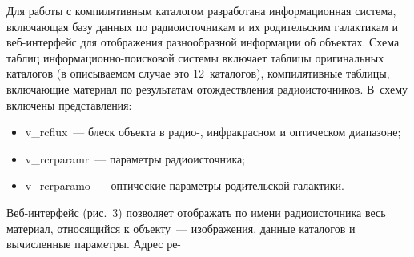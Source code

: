 \begin{multicols}{2}
      
      Для работы с компилятивным каталогом разработана информационная система, 
включающая базу данных по радиоисточникам и их родительским галактикам и 
      веб-ин\-тер\-фейс для отображения разнообразной информации об объектах. Схема 
таб\-лиц ин\-фор\-ма\-ци\-он\-но-по\-иско\-вой сис\-те\-мы включает таблицы оригинальных 
каталогов (в опи\-сы\-ва\-емом случае это 12~каталогов), компилятивные таб\-ли\-цы, вклю\-ча\-ющие 
материал по результатам отож\-де\-ст\-вле\-ния радиоисточников. В~схему включены 
представления: 
      \begin{itemize}
\item v\_rcflux~--- блеск объекта в радио-, инфракрасном и оптическом диапазоне; 
\item v\_rcrparamr~--- параметры радиоисточника; 
\item v\_rcrparamo~--- оптические параметры родительской галактики.
\end{itemize}



Веб-ин\-тер\-фейс (рис.~3) позволяет отображать по имени радиоисточника весь материал, 
относящийся к объекту~--- изображения, данные каталогов и вычисленные па\-ра\-мет\-ры. 
Адрес ре-\linebreak\vspace*{-12pt}

\pagebreak

\end{multicols}

\begin{figure*} %
\vspace*{1pt}
 \begin{center}
 \mbox{%
 \epsfxsize=161.754mm
 }
 \end{center}
 \vspace*{-9pt}
\vspace*{6pt}
\end{figure*}


